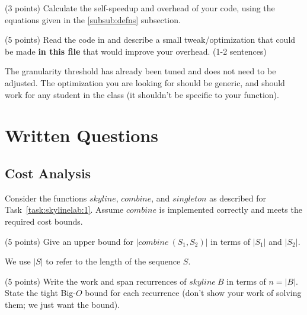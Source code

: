 \begin{task}[5]
(3 points)
Calculate the self-speedup and overhead of your code, using the equations
given in the \ref{subsub:defns} subsection.
\end{task}

\begin{task}[6]
(5 points)
Read the code in  and describe a small
tweak/optimization that could be made \textbf{in this file} that would improve
your overhead. (1-2 sentences)
\end{task}

\begin{note}
The granularity threshold has already been tuned and does not need to be adjusted.
The optimization you are looking for should be generic, and should work for any
student in the class (it shouldn't be specific to your  function).
\end{note}

\section{Written Questions}

\subsection{Cost Analysis}
\begin{gram}
Consider the functions $\mathit{skyline}$, $\mathit{combine}$, and $\mathit{singleton}$ as
described for Task~\ref{task:skylinelab:1}. Assume $\mathit{combine}$ is
implemented correctly and meets the required cost bounds.
\end{gram}

\begin{flex}
\begin{task}[7]
(5 points)
Give an upper bound for $\left|\mathit{combine}~(S_1, S_2)\right|$ in terms
of $|S_1|$ and $|S_2|$.
\end{task}

\begin{note}
We use $|S|$ to refer to the length of the sequence $S$.
\end{note}
\end{flex}

\begin{task}[8]
(5 points)
Write the work and span recurrences of $\mathit{skyline}~B$ in
terms of $n = |B|$. State the tight Big-$O$ bound for each recurrence (don't
show your work of solving them; we just want the bound).
\end{task}

